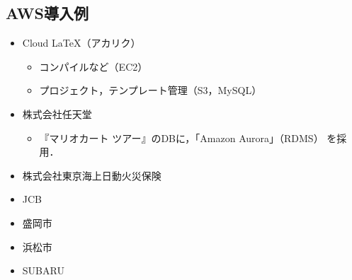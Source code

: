 \subsection{AWS導入例}
\begin{frame}[t]{\ftitle}
    \begin{itemize}
        \item Cloud LaTeX（アカリク）
              \begin{itemize}
                  \item コンパイルなど（EC2）
                  \item プロジェクト，テンプレート管理（S3，MySQL）
              \end{itemize}
        \item 株式会社任天堂
              \begin{itemize}
                  \item 『マリオカート ツアー』のDBに，「Amazon Aurora」（RDMS） を採用．
              \end{itemize}
        \item 株式会社東京海上日動火災保険
        \item JCB
        \item 盛岡市
        \item 浜松市
        \item SUBARU
    \end{itemize}
    \hfill\cite{導入事例}
\end{frame}